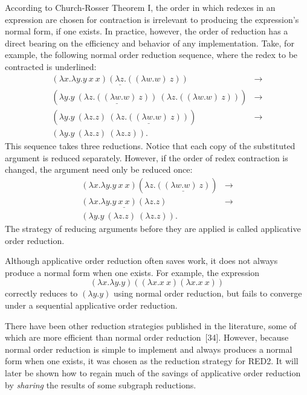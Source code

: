 According to Church-Rosser Theorem I, the order in which redexes in an
expression are chosen for contraction is irrelevant to producing the expression's
normal form, if one exists. In practice, however, the order of reduction has a
direct bearing on the efficiency and behavior of any \lambdacalculus{}
implementation. Take, for example, the following normal order reduction
sequence, where the redex to be contracted is underlined:
\[
\begin{aligned}
\underline{(\lambda x.\lambda y.y\ x\ x)(\lambda z.((\lambda w.w)\ z))}
&\longrightarrow\\
(\lambda y.y\ \underline{(\lambda z.((\lambda w.w)\ z))}\ (\lambda z.((\lambda w.w)\ z)))
&\longrightarrow\\
(\lambda y.y\ (\lambda z.z)\ \underline{(\lambda z.((\lambda w.w)\ z))})
&\longrightarrow\\
(\lambda y.y\ (\lambda z.z)\ (\lambda z.z)).
\end{aligned}
\]
This sequence takes three reductions. Notice that each copy of the substituted
argument is reduced separately. However, if the order of redex contraction is
changed, the argument need only be reduced once:
\[
\begin{aligned}
(\lambda x.\lambda y.y\ x\ x)(\lambda z.\underline{((\lambda w.w)\ z)})
&\longrightarrow\\
\underline{(\lambda x.\lambda y.y\ x\ x)(\lambda z.z)}
&\longrightarrow\\
(\lambda y.y\ (\lambda z.z)\ (\lambda z.z)).
\end{aligned}
\]
The strategy of reducing arguments before they are applied is called
applicative order reduction.

Although applicative order reduction often saves work, it does not always
produce a normal form when one exists. For example, the expression
\[
(\lambda x.\lambda y.y)((\lambda x.x\ x)(\lambda x.x\ x))
\]
correctly reduces to \((\lambda y.y)\) using normal order reduction, but fails
to converge under a sequential applicative order reduction.

There have been other reduction strategies published in the literature, some of
which are more efficient than normal order reduction~[34]. However, because
normal order reduction is simple to implement and always produces a normal form
when one exists, it was chosen as the reduction strategy for RED2. It will later
be shown how to regain much of the savings of applicative order reduction by
\emph{sharing} the results of some subgraph reductions.

